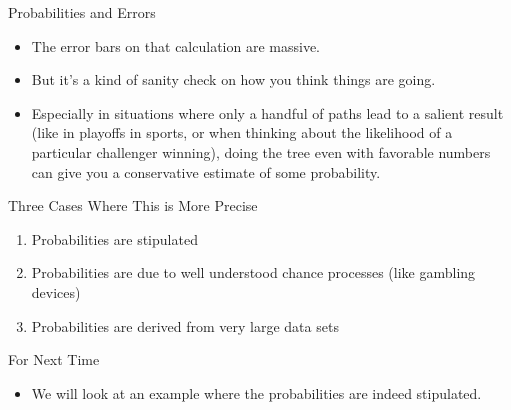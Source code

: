 \documentclass[
  ignorenonframetext,
]{beamer}
\providecommand{\tightlist}{%
  \setlength{\itemsep}{0pt}\setlength{\parskip}{0pt}}
\renewcommand{\,}{\text{, }}
\begin{document}
\begin{frame}{Probabilities and Errors}
\protect\hypertarget{probabilities-and-errors}{}

\begin{itemize}
\tightlist
\item
  The error bars on that calculation are massive.
\item
  But it's a kind of sanity check on how you think things are going.
\item
  Especially in situations where only a handful of paths lead to a
  salient result (like in playoffs in sports, or when thinking about the
  likelihood of a particular challenger winning), doing the tree even
  with favorable numbers can give you a conservative estimate of some
  probability.
\end{itemize}

\end{frame}

\begin{frame}{Three Cases Where This is More Precise}
\protect\hypertarget{three-cases-where-this-is-more-precise}{}

\begin{enumerate}
\tightlist
\item
  Probabilities are stipulated
\item
  Probabilities are due to well understood chance processes (like
  gambling devices)
\item
  Probabilities are derived from very large data sets
\end{enumerate}

\end{frame}

\begin{frame}{For Next Time}
\protect\hypertarget{for-next-time}{}

\begin{itemize}
\tightlist
\item
  We will look at an example where the probabilities are indeed
  stipulated.
\end{itemize}

\end{frame}
\end{document}

